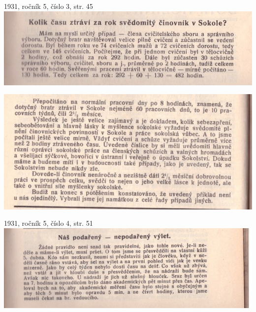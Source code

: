\documentclass[11pt]{article}
\begin{document}
\clearpage

1931, ročník 5, číslo 3, str. 45 \\
\includegraphics[width=\imagewidth]{original/1931/Skener_20250315 (2).jpg}

\includegraphics[width=\imagewidth]{original/1931/Skener_20250315 (3).jpg}

\vspace*{\baselineskip}
1931, ročník 5, číslo 4, str. 51 \\
\includegraphics[width=\imagewidth]{original/1931/Skener_20250315 (8).jpg}
\end{document}
